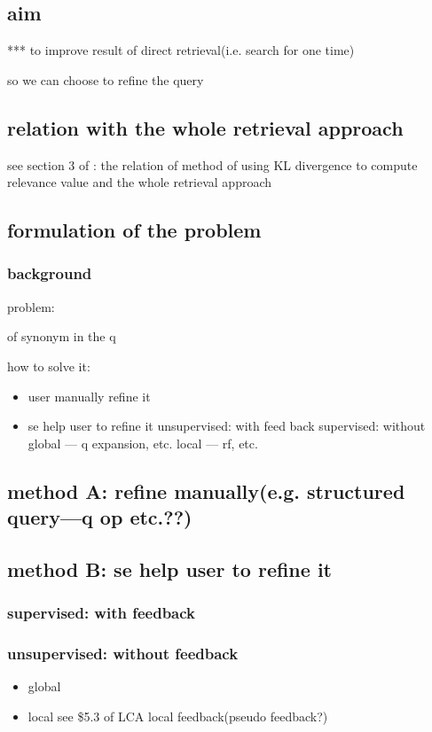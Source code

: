 \documentclass[•]{article}
\begin{document}
\subsection{aim}
*** to improve result of direct retrieval(i.e. search for one time)

so we can choose to refine the query

\subsection{relation with the whole retrieval approach}
see section 3 of \cite{Zhai2001}: the relation of method of using KL divergence to compute relevance value and the whole retrieval approach

\subsection{formulation of the problem}
\subsubsection{background}
problem:

of synonym in the q

how to solve it:

\begin{itemize}
\item user manually refine it
\item se help user to refine it
\subitem unsupervised: with feed back
\subitem supervised: without
\subitem global --- q expansion, etc.
\subitem local --- rf, etc.
\end{itemize}


\subsection{method A: refine manually(e.g. structured query---q op etc.??)}

\subsection{method B: se help user to refine it}

\subsubsection{supervised: with feedback}


\subsubsection{unsupervised: without feedback}
\begin{itemize}
\item global
\item local see \$5.3 of \cite{Ponte1998}
\subitem LCA
\subitem local feedback(pseudo feedback?)
\end{itemize}
\end{document}
